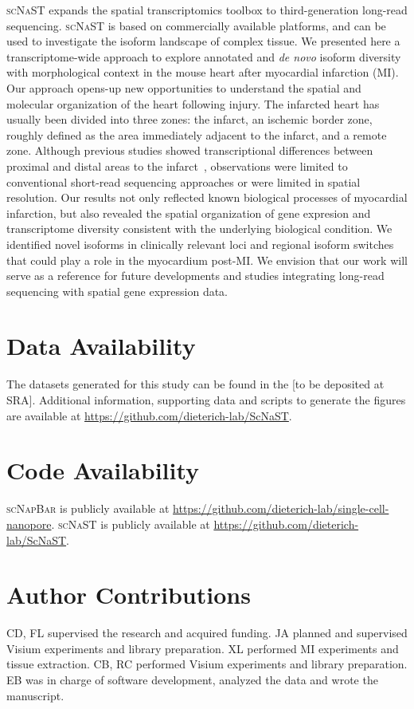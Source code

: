 \documentclass[utf8]{FrontiersinHarvard} %
\newcommand{\denovo}{\textit{de novo}\xspace}
\newcommand{\scn}{\textsc{scNapBar}\xspace}
\newcommand{\scnast}{\textsc{scNaST}\xspace}
\begin{document}
\scnast expands the spatial transcriptomics toolbox to third-generation long-read sequencing.
\scnast is based on commercially available platforms, and can be used to investigate the isoform landscape of complex tissue.
We presented here a transcriptome-wide approach to explore annotated and \denovo isoform diversity with morphological context in the mouse heart after myocardial infarction (MI).
Our approach opens-up new opportunities to understand the spatial and molecular organization of the heart following injury.
The infarcted heart has usually been divided into three zones: the infarct, an ischemic border zone, roughly defined as the area immediately adjacent to the infarct, and a remote zone. 
Although previous studies showed transcriptional differences between proximal and distal areas to the infarct~\citep{Duijvenboden2019:Nppb_BZ}, observations were limited to conventional short-read sequencing approaches or were limited in spatial resolution.
Our results not only reflected known biological processes of myocardial infarction, but also revealed the spatial organization of gene expresion and transcriptome diversity consistent with the underlying biological condition.
We identified novel isoforms in clinically relevant loci and regional isoform switches that could play a role in the myocardium post-MI.
We envision that our work will serve as a reference for future developments and studies integrating long-read sequencing with spatial gene expression data.



\section*{Data Availability}
The datasets generated for this study can be found in the [to be deposited at SRA].
Additional information, supporting data and scripts to generate the figures are available at \url{https://github.com/dieterich-lab/ScNaST}.

\section*{Code Availability}
\scn is publicly available at \url{https://github.com/dieterich-lab/single-cell-nanopore}.
\scnast is publicly available at \url{https://github.com/dieterich-lab/ScNaST}.

\section*{Author Contributions}
CD, FL supervised the research and acquired funding.
JA planned and supervised Visium experiments and library preparation.
XL performed MI experiments and tissue extraction.
CB, RC performed Visium experiments and library preparation.
EB was in charge of software development, analyzed the data and wrote the manuscript.
\end{document}
